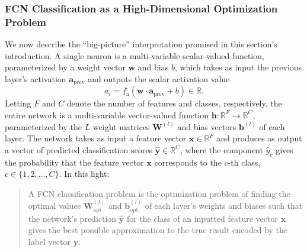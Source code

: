 \documentclass[11pt, a4paper]{article}
\renewcommand{\vec}[1]{\bm{#1}}
\newcommand{\mat}[1]{\mathbf{#1}}
\newcommand{\W}{\mat{W}}
\newcommand{\x}{\vec{x}}
\newcommand{\y}{\vec{y}}
\newcommand{\w}{\vec{w}}
\renewcommand{\b}{\vec{b}}
\renewcommand{\a}{\vec{a}}
\begin{document}
\subsubsection{FCN Classification as a High-Dimensional Optimization Problem} \label{sss:fcn-interpretation}
We now describe the ``big-picture'' interpretation promised in this section's introduction. A single neuron is a multi-variable scalar-valued function, parameterized by a weight vector $ \w $ and bias $ b $, which takes as input the previous layer's activation $ \a_{\text{prev}} $ and outputs the scalar activation value
\begin{equation*}
    a_{i} = f_{\text{a}} (\w \cdot \a_{\text{prev}} + b) \in \mathbb{R}.
\end{equation*}
Letting $ F $ and $ C $ denote the number of features and classes, respectively, the entire network is a multi-variable vector-valued function $ \vec{h}: \mathbb{R}^{F} \to \mathbb{R}^{C} $, parameterized by the $ L $ weight matrices $ \W^{(l)} $ and bias vectors $ \b^{(l)} $ of each layer. The network takes as input a feature vector $ \x \in \mathbb{R}^{F} $ and produces as output a vector of predicted classification scores $ \hat{\y} \in \mathbb{R}^{C} $, where the component $ \hat{y}_{c} $ gives the probability that the feature vector $ \x $ corresponds to the $ c $-th class, $ c \in \{1, 2, \ldots, C \} $. In this light:
\begin{quote}
    A FCN classification problem is the optimization problem of finding the optimal values $ \W_{\text{opt}}^{(l)} $ and $ \b_{\text{opt}}^{(l)} $ of each layer's weights and biases such that the network's prediction $ \hat{\y} $ for the class of an inputted feature vector $ \x $ gives the best possible approximation to the true result encoded by the label vector $ \vec{y} $.
\end{quote}
\end{document}
